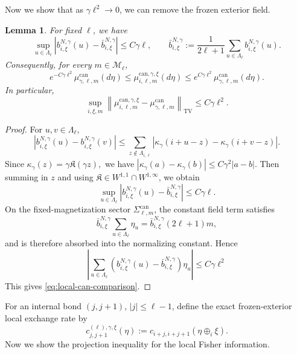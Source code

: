 \documentclass{article}
\newtheorem{lemma}{Lemma}
\begin{document}
Now we show that as $\gamma\ell^2 \to 0$, we can remove the frozen exterior field.
\begin{lemma}\label{lem:remove-frozen-field}
For fixed \(\ell\), we have
\[
\sup_{u\in\Lambda_\ell}
\left|
b_{i,\xi}^{N,\gamma}(u)
-
\bar b_{i,\xi}^{N,\gamma}
\right|
\le
C\gamma\ell,
\qquad
\bar b_{i,\xi}^{N,\gamma}
:=
\frac{1}{2\ell+1}
\sum_{u\in\Lambda_\ell}
b_{i,\xi}^{N,\gamma}(u).
\]
Consequently, for every \(m\in\mathcal M_\ell\),
\begin{equation}
\label{eq:local-can-comparison}
e^{-C\gamma\ell^2}
\mu_{\gamma,\ell,m}^{\mathrm{can}}(d\eta)
\le
\mu_{i,\ell,m}^{\mathrm{can},\gamma,\xi}(d\eta)
\le
e^{C\gamma\ell^2}
\mu_{\gamma,\ell,m}^{\mathrm{can}}(d\eta).
\end{equation}
In particular,
\[
\sup_{i,\xi,m}
\left\|
\mu_{i,\ell,m}^{\mathrm{can},\gamma,\xi}
-
\mu_{\gamma,\ell,m}^{\mathrm{can}}
\right\|_{\mathrm{TV}}
\le
C\gamma\ell^2.
\]
\end{lemma}

\begin{proof}
For \(u,v\in\Lambda_\ell\),
\[
\left|
b_{i,\xi}^{N,\gamma}(u)
-
b_{i,\xi}^{N,\gamma}(v)
\right|
\le
\sum_{z\notin\Lambda_{i,\ell}}
\left|
\kappa_\gamma(i+u-z)
-
\kappa_\gamma(i+v-z)
\right|.
\]
Since
\(
\kappa_\gamma(z)=\gamma\mathfrak K(\gamma z),
\)
we have
\(
|\kappa_\gamma(a)-\kappa_\gamma(b)|
\le
C\gamma^2|a-b|.
\)
Then summing in \(z\) and using \(\mathfrak K\in W^{1,1}\cap W^{1,\infty}\), we obtain
\[
\sup_{u\in\Lambda_\ell}
\left|
b_{i,\xi}^{N,\gamma}(u)
-
\bar b_{i,\xi}^{N,\gamma}
\right|
\le C\gamma\ell.
\]
On the fixed-magnetization sector \(\Sigma_{\ell,m}^{\mathrm{can}}\), the constant field term satisfies
\[
\bar b_{i,\xi}^{N,\gamma}
\sum_{u\in\Lambda_\ell}\eta_u
=
\bar b_{i,\xi}^{N,\gamma}(2\ell+1)m,
\]
and is therefore absorbed into the normalizing constant. Hence
\[
\left| \sum_{u\in\Lambda_\ell}
\left(
b_{i,\xi}^{N,\gamma}(u)
-
\bar b_{i,\xi}^{N,\gamma}
\right)\eta_u \right| \le C\gamma\ell^2
\]
This gives
\eqref{eq:local-can-comparison}.
\end{proof}


For an internal bond \((j,j+1)\), \(|j|\le\ell-1\), define the exact frozen-exterior local exchange rate by
\[
c_{j,j+1}^{(\ell),\gamma,\xi}(\eta)
:=
c_{i+j,i+j+1}(\eta\oplus_i\xi).
\]
Now we show the projection inequality for the local Fisher information.
\end{document}
